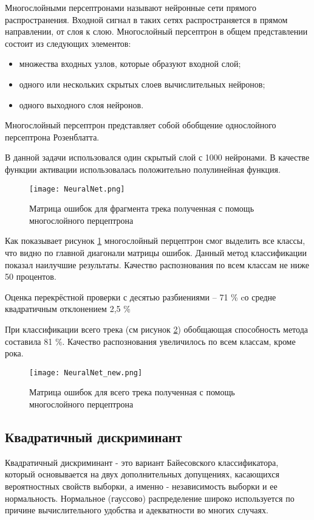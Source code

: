 Многослойными персептронами называют нейронные сети прямого распространения. Входной сигнал в таких сетях распространяется в прямом направлении, от слоя к слою. Многослойный персептрон в общем представлении состоит из следующих элементов:
\begin{itemize}
\item    множества входных узлов, которые образуют входной слой;
\item    одного или нескольких скрытых слоев вычислительных нейронов;
\item    одного выходного слоя нейронов.
\end{itemize}
Многослойный персептрон представляет собой обобщение однослойного персептрона Розенблатта.

В данной задачи использовался один скрытый слой с 1000 нейронами. В качестве функции активации использовалась положительно полулинейная функция.

\begin{figure}[h]
\centering
  \texttt{[image: NeuralNet.png]}
  \caption{Матрица ошибок для фрагмента трека полученная с помощь многослойного перцептрона}
  \label{fig:results:NeuralNet}
\end{figure}

Как показывает рисунок \ref{fig:results:NeuralNet} многослойный перцептрон смог выделить все классы, что видно по главной диагонали матрицы ошибок. Данный метод классификации показал наилучшие результаты. Качество распознования по всем классам не ниже 50 процентов.

Оценка перекрёстной проверки с десятью разбиениями -- 71 \% cо средне квадратичным отклонением 2,5 \%

При классификации всего трека (см рисунок \ref{fig:results:NeuralNet_new}) обобщающая способность метода составила 81 \%. Качество распознования увеличилось по всем классам, кроме рока. 

\begin{figure}[h]
\centering
  \texttt{[image: NeuralNet\_new.png]}
  \caption{Матрица ошибок  для всего трека  полученная с помощь многослойного перцептрона}
  \label{fig:results:NeuralNet_new}
\end{figure}



\subsection{Квадратичный дискриминант}


Квадратичный дискриминант - это вариант Байесовского классификатора, который основывается на двух дополнительных допущениях, касающихся вероятностных свойств выборки, а именно - независимость выборки и ее нормальность. Нормальное (гауссово) распределение широко используется по причине вычислительного удобства и адекватности во многих случаях. 

